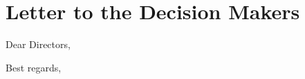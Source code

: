\section*{Letter to the Decision Makers}
\begin{spacing}{0.9}
	Dear Directors,
	
	
	
	\noindent
	Best regards,\\
	\team
\end{spacing}